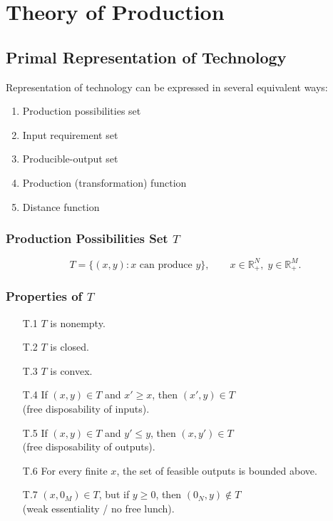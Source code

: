 \chapter{Theory of  Production}

\section{Primal Representation of Technology}

Representation of technology can be expressed in several equivalent ways:

\begin{enumerate}
    \item Production possibilities set
    \item Input requirement set
    \item Producible-output set
    \item Production (transformation) function
    \item Distance function
\end{enumerate}


\subsection{Production Possibilities Set $T$}

\[
T = \{(x,y) : x \text{ can produce } y\},
\qquad x \in \mathbb{R}^N_+,\; y \in \mathbb{R}^M_+.
\]

\subsection*{Properties of $T$}

\begin{itemize}
    \item[T.1] $T$ is nonempty.
    
    \item[T.2] $T$ is closed.
    
    \item[T.3] $T$ is convex.
    
    \item[T.4] If $(x,y) \in T$ and $x' \ge x$, then $(x',y) \in T$
    \\(free disposability of inputs).
    
    \item[T.5] If $(x,y) \in T$ and $y' \le y$, then $(x,y') \in T$
    \\(free disposability of outputs).
    
    \item[T.6] For every finite $x$, the set of feasible outputs is bounded above.
    
    \item[T.7] $(x,0_M) \in T$, but if $y \ge 0$, then $(0_N,y) \notin T$
    \\(weak essentiality / no free lunch).
\end{itemize}

